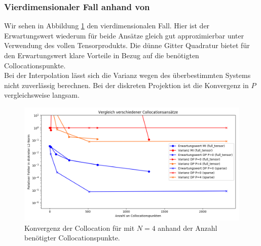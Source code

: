 \subsubsection*{Vierdimensionaler Fall anhand von }
Wir sehen in Abbildung \ref{fig:collocation_comparison_trial8} den vierdimensionalen Fall. Hier ist der Erwartungswert wiederum für beide Ansätze gleich gut approximierbar unter Verwendung des vollen Tensorprodukts. Die dünne Gitter Quadratur bietet für den Erwartungswert klare Vorteile in Bezug auf die benötigten Collocationspunkte.\\
Bei der Interpolation lässt sich die Varianz wegen des überbestimmten Systems nicht zuverlässig berechnen. Bei der diskreten Projektion ist die Konvergenz in $P$ vergleichsweise langsam.
\begin{figure}[!htb]
\includegraphics[width=\textwidth]{Figures/collocation_midp_trial8.png}
\caption{Konvergenz der Collocation für  mit $N=4$ anhand der Anzahl benötigter Collocationspunkte.}
\label{fig:collocation_comparison_trial8}
\end{figure}

